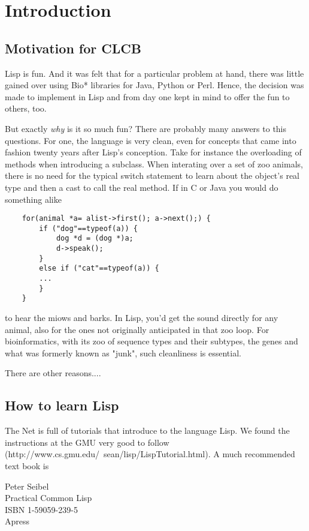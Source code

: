 \documentclass{book}
\begin{document}
\chapter{Introduction}



\section{Motivation for CLCB}

Lisp is fun. And it was felt that for a particular problem at hand, 
there was little gained over using Bio* libraries for Java, Python or Perl.
Hence, the decision was made to implement in Lisp and from day one kept in
mind to offer the fun to others, too.

But exactly {\em why} is it so much fun? There are probably many answers
to this questions.  For one, the language is very clean, even for concepts
that came into fashion twenty years after Lisp's conception. Take
for instance the overloading of methods when introducing a subclass.
When interating over a set of zoo animals, there is no need for the
typical switch statement to learn about the object's real type and then a
cast to call the real method. If in C or Java you would do something alike

\lstset{language=C}
\begin{lstlisting}
	for(animal *a= alist->first(); a->next();) {
		if ("dog"==typeof(a)) {
			dog *d = (dog *)a;
			d->speak();
		}
		else if ("cat"==typeof(a)) {
		...
		}
	}
\end{lstlisting}

to hear the miows and barks.  In Lisp, you'd get the sound directly for
any animal, also for the ones not originally anticipated in that zoo loop.
For bioinformatics, with its zoo of sequence types and their subtypes,
the genes and what was formerly known as "junk", such cleanliness is essential.

There are other reasons....

\section{How to learn Lisp}

The Net is full of tutorials that introduce to the language
Lisp. We found the instructions at the GMU very good to follow
(http://www.cs.gmu.edu/~sean/lisp/LispTutorial.html). A much recommended
text book is

	Peter Seibel\\
	Practical Common Lisp\\
	ISBN 1-59059-239-5\\
	Apress
\end{document}
